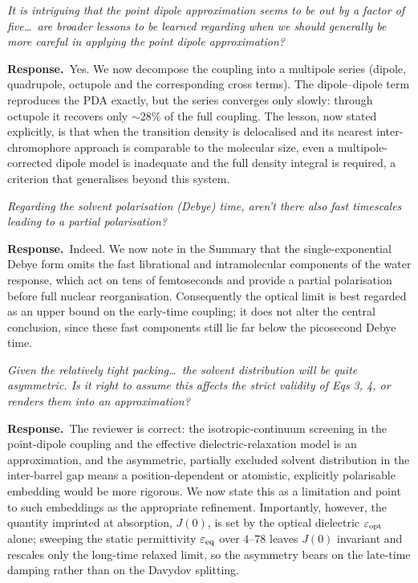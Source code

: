\documentclass[11pt]{article}
\newcommand{\comment}[1]{\begin{revcomment}\itshape #1\end{revcomment}}
\newcommand{\response}[1]{\noindent\textbf{Response.}\ #1\par\vspace{6pt}}
\begin{document}
\comment{It is intriguing that the point dipole approximation seems to be out by a
factor of five\ldots\ are broader lessons to be learned regarding when we should
generally be more careful in applying the point dipole approximation?}

\response{Yes. We now decompose the coupling into a multipole
series (dipole, quadrupole, octupole and the corresponding cross terms). The
dipole--dipole term reproduces the PDA exactly, but the series converges only slowly:
through octupole it recovers only ${\sim}28\%$ of the full coupling. The lesson,
now stated explicitly, is that when the transition density is delocalised and its
nearest inter-chromophore approach is comparable to the molecular size, even a
multipole-corrected dipole model is inadequate and the full density integral is
required, a criterion that generalises beyond this system.}

\comment{Regarding the solvent polarisation (Debye) time, aren't there also fast
timescales leading to a partial polarisation?}

\response{Indeed. We now note in the Summary that the single-exponential Debye form
omits the fast librational and intramolecular components of the water response, which
act on tens of femtoseconds and provide a partial polarisation before full nuclear
reorganisation. Consequently the optical limit is best regarded as an upper bound on
the early-time coupling; it does not alter the central conclusion, since these fast
components still lie far below the picosecond Debye time.}

\comment{Given the relatively tight packing\ldots\ the solvent distribution will be
quite asymmetric. Is it right to assume this affects the strict validity of Eqs 3, 4,
or renders them into an approximation?}

\response{The reviewer is correct: the isotropic-continuum screening in the point-dipole coupling and the
effective dielectric-relaxation model is an approximation, and the asymmetric, partially excluded solvent
distribution in the inter-barrel gap means a position-dependent or atomistic,
explicitly polarisable embedding would be more rigorous. We now state this as a
limitation and point to such embeddings as the appropriate refinement. Importantly,
however, the quantity imprinted at absorption, $J(0)$, is set by the optical dielectric
$\varepsilon_{\rm opt}$ alone; sweeping the static permittivity $\varepsilon_{\rm eq}$
over $4$--$78$ leaves $J(0)$ invariant and rescales only the long-time relaxed limit,
so the asymmetry bears on the late-time damping rather than on the Davydov splitting.}
\end{document}
